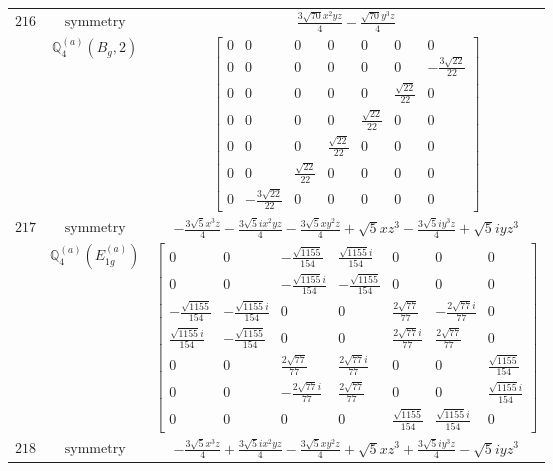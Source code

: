 \documentclass[fleqn,8pt,landscape]{jsarticle}
\begin{document}
\begin{longtable}{ccc}
$ 216 $ & $ \text{symmetry} $ & $ \frac{3 \sqrt{70} x^{2} y z}{4} - \frac{\sqrt{70} y^{3} z}{4} $ \\
$  $ & $ \mathbb{Q}_{4}^{(a)}(B_{g},2) $ & $ \begin{bmatrix} 0 & 0 & 0 & 0 & 0 & 0 & 0 \\ 0 & 0 & 0 & 0 & 0 & 0 & - \frac{3 \sqrt{22}}{22} \\ 0 & 0 & 0 & 0 & 0 & \frac{\sqrt{22}}{22} & 0 \\ 0 & 0 & 0 & 0 & \frac{\sqrt{22}}{22} & 0 & 0 \\ 0 & 0 & 0 & \frac{\sqrt{22}}{22} & 0 & 0 & 0 \\ 0 & 0 & \frac{\sqrt{22}}{22} & 0 & 0 & 0 & 0 \\ 0 & - \frac{3 \sqrt{22}}{22} & 0 & 0 & 0 & 0 & 0 \end{bmatrix} $ \\ \hline
$ 217 $ & $ \text{symmetry} $ & $ - \frac{3 \sqrt{5} x^{3} z}{4} - \frac{3 \sqrt{5} i x^{2} y z}{4} - \frac{3 \sqrt{5} x y^{2} z}{4} + \sqrt{5} x z^{3} - \frac{3 \sqrt{5} i y^{3} z}{4} + \sqrt{5} i y z^{3} $ \\
$  $ & $ \mathbb{Q}_{4}^{(a)}(E_{1g}^{(a)}) $ & $ \begin{bmatrix} 0 & 0 & - \frac{\sqrt{1155}}{154} & \frac{\sqrt{1155} i}{154} & 0 & 0 & 0 \\ 0 & 0 & - \frac{\sqrt{1155} i}{154} & - \frac{\sqrt{1155}}{154} & 0 & 0 & 0 \\ - \frac{\sqrt{1155}}{154} & - \frac{\sqrt{1155} i}{154} & 0 & 0 & \frac{2 \sqrt{77}}{77} & - \frac{2 \sqrt{77} i}{77} & 0 \\ \frac{\sqrt{1155} i}{154} & - \frac{\sqrt{1155}}{154} & 0 & 0 & \frac{2 \sqrt{77} i}{77} & \frac{2 \sqrt{77}}{77} & 0 \\ 0 & 0 & \frac{2 \sqrt{77}}{77} & \frac{2 \sqrt{77} i}{77} & 0 & 0 & \frac{\sqrt{1155}}{154} \\ 0 & 0 & - \frac{2 \sqrt{77} i}{77} & \frac{2 \sqrt{77}}{77} & 0 & 0 & \frac{\sqrt{1155} i}{154} \\ 0 & 0 & 0 & 0 & \frac{\sqrt{1155}}{154} & \frac{\sqrt{1155} i}{154} & 0 \end{bmatrix} $ \\ \hline
$ 218 $ & $ \text{symmetry} $ & $ - \frac{3 \sqrt{5} x^{3} z}{4} + \frac{3 \sqrt{5} i x^{2} y z}{4} - \frac{3 \sqrt{5} x y^{2} z}{4} + \sqrt{5} x z^{3} + \frac{3 \sqrt{5} i y^{3} z}{4} - \sqrt{5} i y z^{3} $ \\

\end{longtable}
\end{document}
